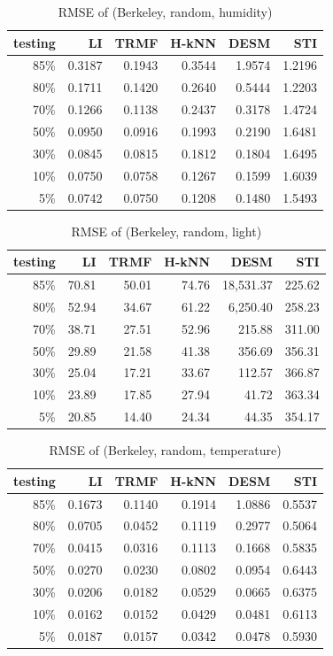 \begin{table}[htbp]
\centering
\caption{RMSE of (Berkeley, random, humidity)}
\label{table:berkeley_random_hum}
\begin{tabular}{ r | r r r r r}
	testing	&LI	&TRMF	&H-kNN	&DESM	&STI\\ \hline
	85\%	&0.3187	&0.1943	&0.3544	&1.9574	&1.2196\\ 
	80\%	&0.1711	&0.1420	&0.2640	&0.5444	&1.2203\\
	70\%	&0.1266	&0.1138	&0.2437	&0.3178	&1.4724\\
	50\%	&0.0950	&0.0916	&0.1993	&0.2190	&1.6481\\
	30\%	&0.0845	&0.0815	&0.1812	&0.1804	&1.6495\\
	10\%	&0.0750	&0.0758	&0.1267	&0.1599	&1.6039\\
	 5\%	&0.0742	&0.0750	&0.1208	&0.1480	&1.5493\\
\end{tabular}
\end{table}

\begin{table} [htbp]
\centering
\caption{RMSE of (Berkeley, random, light)}
\label{table:berkeley_random_light}
\begin{tabular}{ r | r r r r r}
	testing	&LI	&TRMF	&H-kNN	&DESM	&STI\\ \hline
	85\%	&70.81	&50.01	&74.76	&18,531.37	&225.62\\
	80\%	&52.94	&34.67	&61.22	&6,250.40	&258.23\\
	70\%	&38.71	&27.51	&52.96	&215.88	&311.00\\
	50\%	&29.89	&21.58	&41.38	&356.69	&356.31\\
	30\%	&25.04	&17.21	&33.67	&112.57	&366.87\\
	10\%	&23.89	&17.85	&27.94	&41.72	&363.34\\
	 5\%	&20.85	&14.40	&24.34	&44.35	&354.17\\
\end{tabular}
\end{table}

\begin{table}[htbp]
\centering
\caption{RMSE of (Berkeley, random, temperature)}
\label{table:berkeley_random_tem}
\begin{tabular}{ r | r r r r r}
	testing	&LI	&TRMF	&H-kNN	&DESM	&STI\\ \hline
	85\%	&0.1673	&0.1140	&0.1914	&1.0886	&0.5537\\
	80\%	&0.0705	&0.0452	&0.1119	&0.2977	&0.5064\\
	70\%	&0.0415	&0.0316	&0.1113	&0.1668	&0.5835\\
	50\%	&0.0270	&0.0230	&0.0802	&0.0954	&0.6443\\
	30\%	&0.0206	&0.0182	&0.0529	&0.0665	&0.6375\\
	10\%	&0.0162	&0.0152	&0.0429	&0.0481	&0.6113\\
	 5\%	&0.0187	&0.0157	&0.0342	&0.0478	&0.5930\\
\end{tabular}
\end{table}

